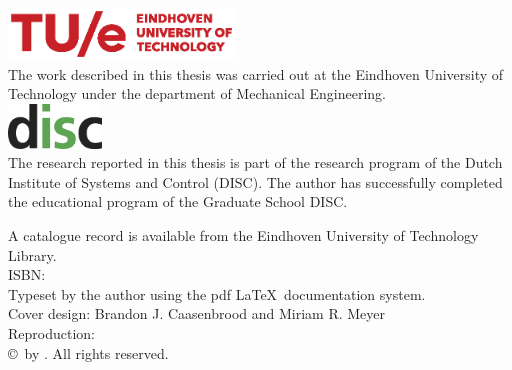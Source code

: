 \thispagestyle{empty}
\vspace*{30mm}\noindent
\begin{center}
{\LARGE\sf\maintitle}\\[4.5cm] %
{\Large\sf \@author}
\end{center}

\newpage
\thispagestyle{empty}

\vspace*{\fill}

\hspace*{-7mm}\includegraphics[width=6cm]{./img/TUeLOG_new.eps}\\
{\small The work described in this thesis was carried out at the Eindhoven University of
Technology under the department of Mechanical Engineering.}\\[8mm]

\hspace*{-4mm}\includegraphics[width=2.5cm]{./img/disc_logo_kleur.png}\\[2mm]
\noindent\bgroup\small
The research reported in this thesis is part of the research program of the Dutch Institute of Systems and Control (DISC). The author has successfully completed the educational program of the Graduate School DISC.

\noindent\bgroup\small
A catalogue record is available from the Eindhoven University of Technology Library.\\
ISBN: \isbn\\[4mm]
Typeset by the author using the pdf \LaTeX \ documentation system.\\
Cover design: Brandon J. Caasenbrood and Miriam R. Meyer \\
Reproduction: \printer\\[8mm]
\copyright\year\, by \@author. All rights reserved.}
\egroup

\newpage
\thispagestyle{empty}




